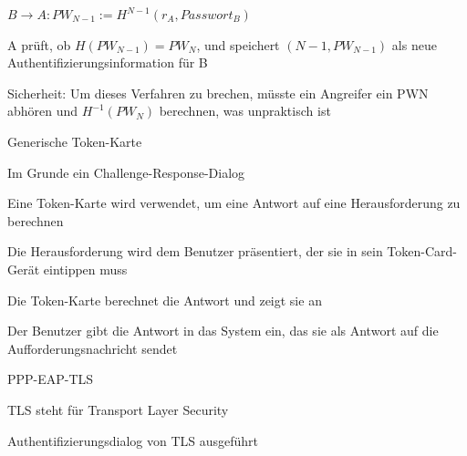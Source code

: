 \documentclass[a4paper]{article}
\begin{document}
\begin{multicols}{3}
\begin{itemize*}
\begin{itemize*}
\begin{itemize*}
                        \item $B\rightarrow A: PW_{N-1} := H^{N-1}(r_A, Passwort_B)$
                        \item A prüft, ob $H(PW_{N-1}) = PW_N$, und speichert $(N-1, PW_{N-1})$ als neue Authentifizierungsinformation für B
                  \end{itemize*}
                  \item Sicherheit: Um dieses Verfahren zu brechen, müsste ein Angreifer ein PWN abhören und $H^{-1}(PW_N)$ berechnen, was unpraktisch ist
            \end{itemize*}
            \item Generische Token-Karte
            \begin{itemize*}
                  \item Im Grunde ein Challenge-Response-Dialog
                  \item Eine Token-Karte wird verwendet, um eine Antwort auf eine Herausforderung zu berechnen
                  \item Die Herausforderung wird dem Benutzer präsentiert, der sie in sein Token-Card-Gerät eintippen muss
                  \item Die Token-Karte berechnet die Antwort und zeigt sie an
                  \item Der Benutzer gibt die Antwort in das System ein, das sie als Antwort auf die Aufforderungsnachricht sendet
            \end{itemize*}
            \item PPP-EAP-TLS
            \begin{itemize*}
                  \item TLS steht für Transport Layer Security
                  \item Authentifizierungsdialog von TLS ausgeführt
            \end{itemize*}
      \end{itemize*}


\end{multicols}
\end{document}
